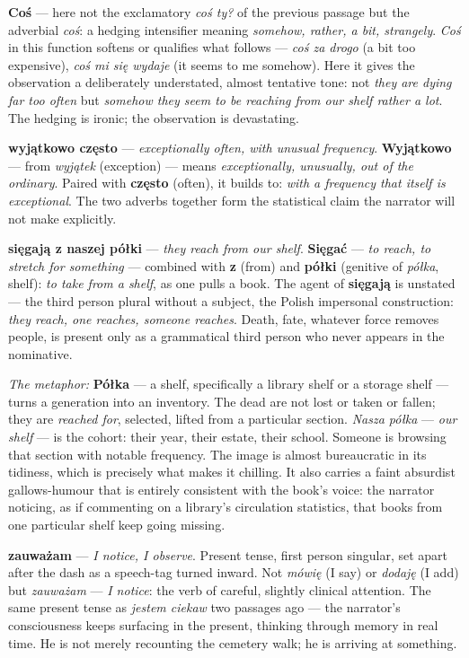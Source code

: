 \textbf{Coś} --- here not the exclamatory \textit{coś ty?}
of the previous passage but the adverbial \textit{coś}: a
hedging intensifier meaning \textit{somehow, rather, a bit,
strangely}. \textit{Coś} in this function softens or
qualifies what follows --- \textit{coś za drogo} (a bit too
expensive), \textit{coś mi się wydaje} (it seems to me
somehow). Here it gives the observation a deliberately
understated, almost tentative tone: not \textit{they are
dying far too often} but \textit{somehow they seem to be
reaching from our shelf rather a lot}. The hedging is
ironic; the observation is devastating.

\textbf{wyjątkowo często} --- \textit{exceptionally often,
with unusual frequency}. \textbf{Wyjątkowo} --- from
\textit{wyjątek} (exception) --- means \textit{exceptionally,
unusually, out of the ordinary}. Paired with \textbf{często}
(often), it builds to: \textit{with a frequency that itself
is exceptional}. The two adverbs together form the
statistical claim the narrator will not make explicitly.

\textbf{sięgają z naszej półki} --- \textit{they reach from
our shelf}. \textbf{Sięgać} --- \textit{to reach, to
stretch for something} --- combined with \textbf{z} (from)
and \textbf{półki} (genitive of \textit{półka}, shelf):
\textit{to take from a shelf}, as one pulls a book.
The agent of \textbf{sięgają} is unstated --- the third
person plural without a subject, the Polish impersonal
construction: \textit{they reach, one reaches, someone
reaches}. Death, fate, whatever force removes people, is
present only as a grammatical third person who never
appears in the nominative.

\medskip
\noindent\textit{The metaphor:} \textbf{Półka} --- a shelf,
specifically a library shelf or a storage shelf --- turns
a generation into an inventory. The dead are not lost or
taken or fallen; they are \textit{reached for}, selected,
lifted from a particular section. \textit{Nasza półka}
--- \textit{our shelf} --- is the cohort: their year,
their estate, their school. Someone is browsing that
section with notable frequency. The image is almost
bureaucratic in its tidiness, which is precisely what
makes it chilling. It also carries a faint absurdist
gallows-humour that is entirely consistent with the book's
voice: the narrator noticing, as if commenting on a
library's circulation statistics, that books from one
particular shelf keep going missing.

\textbf{zauważam} --- \textit{I notice, I observe}.
Present tense, first person singular, set apart after the
dash as a speech-tag turned inward. Not \textit{mówię}
(I say) or \textit{dodaję} (I add) but \textit{zauważam}
--- \textit{I notice}: the verb of careful, slightly
clinical attention. The same present tense as
\textit{jestem ciekaw} two passages ago --- the narrator's
consciousness keeps surfacing in the present, thinking
through memory in real time. He is not merely recounting
the cemetery walk; he is arriving at something.

